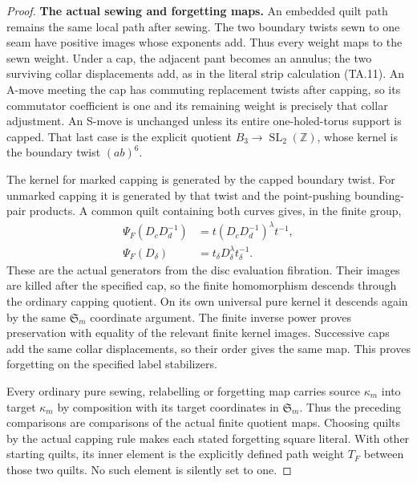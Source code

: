 \begin{proof}
\par\medskip\noindent\textbf{The actual sewing and forgetting maps.}\quad
An embedded quilt path remains the same local
path after sewing.  The two boundary twists sewn
to one seam have positive images whose exponents
add.  Thus every weight maps to the sewn weight.
Under a cap, the adjacent pant becomes an annulus;
the two surviving collar displacements add, as
in the literal strip calculation (TA.11).
An A-move meeting the cap has commuting replacement
twists after capping, so its commutator coefficient
is one and its remaining weight is precisely
that collar adjustment.  An S-move is unchanged
unless its entire one-holed-torus support is capped.
That last case is the explicit quotient
$B_3\to\operatorname{SL}_2(\mathbb Z)$, whose
kernel is the boundary twist $(ab)^6$.

The kernel for marked capping is generated by the
capped boundary twist.  For unmarked capping it
is generated by that twist and the point-pushing
bounding-pair products.  A common quilt containing
both curves gives, in the finite group,
\[
 \begin{aligned}
 \Psi_F(D_cD_d^{-1})
     &=t(D_cD_d^{-1})^\lambda t^{-1},\\
 \Psi_F(D_\delta)&=t_\delta D_\delta^\lambda t_\delta^{-1}.
 \end{aligned}
                                                               \tag{FGA.13}
\]
These are the actual generators from the disc
evaluation fibration.  Their images are killed
after the specified cap, so the finite homomorphism
descends through the ordinary capping quotient.
On its own universal pure kernel it descends again
by the same $\mathfrak S_m$ coordinate argument.
The finite inverse power proves preservation with
equality of the relevant finite kernel images.
Successive caps add the same collar displacements,
so their order gives the same map.  This proves
forgetting on the specified label stabilizers.

Every ordinary pure sewing, relabelling or forgetting
map carries source $\kappa_m$ into target $\kappa_m$
by composition with its target coordinates in
$\mathfrak S_m$.  Thus the preceding comparisons
are comparisons of the actual finite quotient maps.
Choosing quilts by the actual capping rule makes
each stated forgetting square literal.  With other
starting quilts, its inner element is the explicitly
defined path weight $T_F$ between those two quilts.
No such element is silently set to one.


\end{proof}
